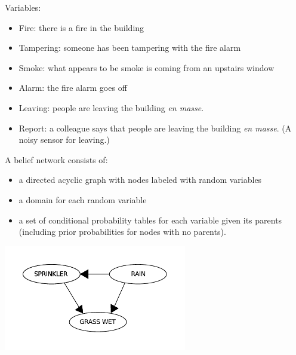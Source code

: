 \documentclass[12pt]{beamer} %
\begin{document}
\begin{slide}
Variables:
\begin{itemize}
\item \alert{Fire}: there is a fire in the building
\item \alert{Tampering}: someone has been tampering with the fire alarm
\item \alert{Smoke}: what appears to be smoke is coming from
  an upstairs window
\item \alert{Alarm}: the fire alarm goes off
\item \alert{Leaving}: people are leaving the building \emph{en
    masse}.
\item \alert{Report}: a colleague says that people are leaving the
  building  \emph{en
    masse}. (A noisy sensor for leaving.)
\end{itemize}
\end{slide}


\begin{slide}
A belief network consists of:
\begin{itemize}
\item a directed acyclic graph with nodes
labeled with random variables
\item a domain for each random
variable 
\item a set of conditional probability tables for each variable given
its parents (including prior probabilities for nodes
with no parents).
\end{itemize}
\end{slide}


\begin{slide}
\begin{center}
\includegraphics[width=0.6\textwidth]{figures/uncert_fig_bayes-net.pdf}
\end{center}
\end{slide}
\end{document}
